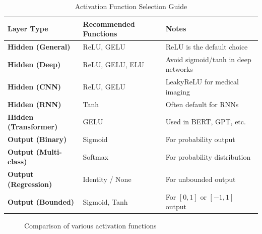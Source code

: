 \begin{table}[h]
    \centering
    \caption{Activation Function Selection Guide}
    \begin{tabular}{L{3cm} L{5cm} L{4cm}}
        \toprule
        \textbf{Layer Type} & \textbf{Recommended Functions} & \textbf{Notes} \\
        \midrule
        \textbf{Hidden (General)} & ReLU, GELU & ReLU is the default choice \\
        \textbf{Hidden (Deep)} & ReLU, GELU, ELU & Avoid sigmoid/tanh in deep networks \\
        \textbf{Hidden (CNN)} & ReLU, GELU & LeakyReLU for medical imaging \\
        \textbf{Hidden (RNN)} & Tanh & Often default for RNNs \\
        \textbf{Hidden (Transformer)} & GELU & Used in BERT, GPT, etc. \\
        \textbf{Output (Binary)} & Sigmoid & For probability output \\
        \textbf{Output (Multi-class)} & Softmax & For probability distribution \\
        \textbf{Output (Regression)} & Identity / None & For unbounded output \\
        \textbf{Output (Bounded)} & Sigmoid, Tanh & For $[0,1]$ or $[-1,1]$ output \\
        \bottomrule
    \end{tabular}
\end{table}

\begin{figure}[h]
    \centering
    \caption[Comparison of activation functions]{Comparison of various activation functions}
    \label{fig:activation_comparison}
\end{figure}

